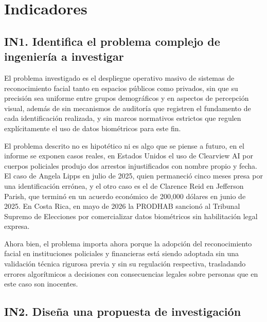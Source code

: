 \section{Indicadores}

\subsection{IN1. Identifica el problema complejo de ingeniería a investigar}

El problema investigado es el despliegue operativo masivo de sistemas de reconocimiento facial tanto en espacios públicos como privados, sin que su precisión sea uniforme entre grupos demográficos y en aspectos de percepción visual, además de sin mecanismos de auditoría que registren el fundamento de cada identificación realizada, y sin marcos normativos estrictos que regulen explícitamente el uso de datos biométricos para este fin.

El problema descrito no es hipotético ni es algo que se piense a futuro, en el informe se exponen casos reales, en Estados Unidos el uso de Clearview AI por cuerpos policiales produjo dos arrestos injustificados con nombre propio y fecha. El caso de Angela Lipps en julio de 2025, quien permaneció cinco meses presa por una identificación errónea, y el otro caso es el de Clarence Reid en Jefferson Parish, que terminó en un acuerdo económico de 200,000 dólares en junio de 2025. En Costa Rica, en mayo de 2026 la PRODHAB sancionó al Tribunal Supremo de Elecciones por comercializar datos biométricos sin habilitación legal expresa.

Ahora bien, el problema importa ahora porque la adopción del reconocimiento facial en instituciones policiales y financieras está siendo adoptada sin una validación técnica rigurosa previa y sin su regulación respectiva, trasladando errores algorítmicos a decisiones con consecuencias legales sobre personas que en este caso son inocentes.


\subsection{IN2. Diseña una propuesta de investigación}

